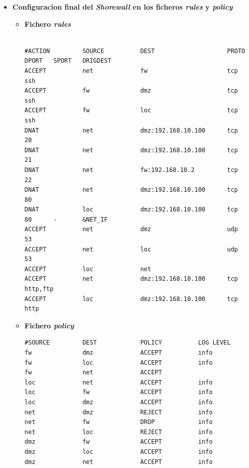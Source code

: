 \documentclass[11pt]{report}
\begin{document}
\begin{itemize}
  \item \textbf{Configuracion final del \emph{Shorewall} en los ficheros \emph{rules} y \emph{policy}}
  \begin{itemize}
    \item \textbf{Fichero \emph{rules}} \\ \\
    \begin{BVerbatim}[fontsize=\fontsize{9}{10}]
#ACTION         SOURCE          DEST                    PROTO           DPORT   SPORT   ORIGDEST
ACCEPT          net             fw                      tcp             ssh
ACCEPT          fw              dmz                     tcp             ssh
ACCEPT          fw              loc                     tcp             ssh
DNAT            net             dmz:192.168.10.100      tcp             20
DNAT            net             dmz:192.168.10.100      tcp             21
DNAT            net             fw:192.168.10.2         tcp             22
DNAT            net             dmz:192.168.10.100      tcp             80
DNAT            loc             dmz:192.168.10.100      tcp             80      -       &NET_IF
ACCEPT          net             dmz                     udp             53
ACCEPT          net             loc                     udp             53
ACCEPT          loc             net
ACCEPT          net             dmz:192.168.10.100      tcp             http,ftp
ACCEPT          loc             dmz:192.168.10.100      tcp             http
    \end{BVerbatim}

    \item \textbf{Fichero \emph{policy}}
    \begin{verbatim}
#SOURCE         DEST            POLICY          LOG LEVEL
fw              dmz             ACCEPT          info
fw              loc             ACCEPT          info
fw              net             ACCEPT
loc             net             ACCEPT          info
loc             fw              ACCEPT          info
loc             dmz             ACCEPT          info
net             dmz             REJECT          info
net             fw              DROP            info
net             loc             REJECT          info
dmz             fw              ACCEPT          info
dmz             loc             ACCEPT          info
dmz             net             ACCEPT          info
    \end{verbatim}
  \end{itemize}

\end{itemize}
\end{document}

